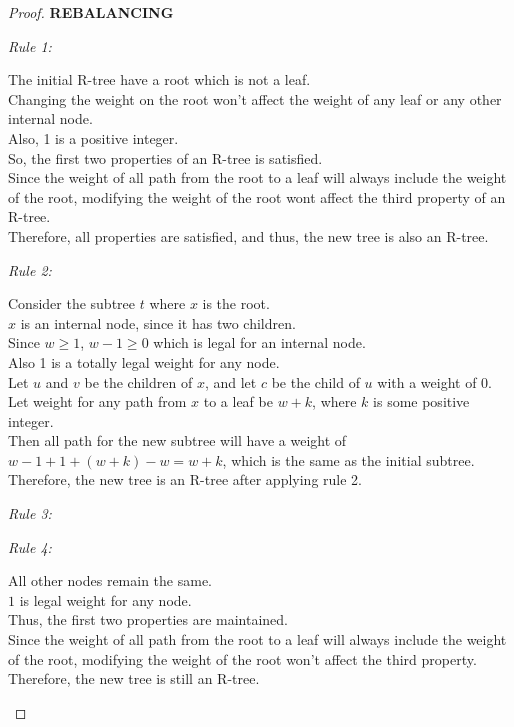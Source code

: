 \documentclass[10pt]{article}
\begin{document}
\begin{enumerate}
\begin{proof}
	\textbf{REBALANCING}
	\begin{addmargin}[1em]{0em}
		\textit{Rule 1:}
		\begin{addmargin}[1em]{0em}
			The initial R-tree have a root which is not a leaf. \\
			Changing the weight on the root won't affect the weight of any leaf
			or any other internal node. \\
			Also, 1 is a positive integer. \\
			So, the first two properties of an R-tree is satisfied. \\
			Since the weight of all path from the root to a leaf will always
			include the weight of the root, modifying the weight of the root
			wont affect the third property of an R-tree. \\
			Therefore, all properties are satisfied, and thus, the new tree is
			also an R-tree. \\
		\end{addmargin}
		\textit{Rule 2:}
		\begin{addmargin}[1em]{0em}
			Consider the subtree $t$ where $x$ is the root. \\
			$x$ is an internal node, since it has two children. \\
			Since $w \geq 1$, $w-1 \geq 0$ which is legal for an internal node.\\
			Also 1 is a totally legal weight for any node. \\
			Let $u$ and $v$ be the children of $x$, and let $c$ be the child of
			$u$ with a weight of 0. \\
			Let weight for any path from $x$ to a leaf be $w+k$, where $k$ is
			some positive integer. \\
			Then all path for the new subtree will have a weight of $w-1 + 1 +
			(w+k) - w = w+k$, which is the same as the initial subtree. \\
			Therefore, the new tree is an R-tree after applying rule 2.
		\end{addmargin}

		\textit{Rule 3:}

		\textit{Rule 4:}
		\begin{addmargin}[1em]{0em}
			All other nodes remain the same. \\
			$1$ is legal weight for any node. \\
			Thus, the first two properties are maintained. \\
			Since the weight of all path from the root to a leaf will always
			include the weight of the root, modifying the weight of the root
			won't affect the third property. \\
			Therefore, the new tree is still an R-tree.
		\end{addmargin}


\end{addmargin}
\end{proof}
\end{enumerate}
\end{document}
